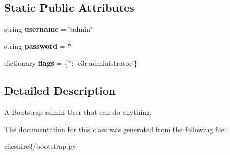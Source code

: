 \subsection*{Static Public Attributes}
\begin{DoxyCompactItemize}
\item 
\hypertarget{classcheshire3_1_1bootstrap_1_1_bootstrap_user_a3e72e213d3d348a2dc7ada96748bbce4}{string {\bfseries username} = \char`\"{}admin\char`\"{}}\label{classcheshire3_1_1bootstrap_1_1_bootstrap_user_a3e72e213d3d348a2dc7ada96748bbce4}

\item 
\hypertarget{classcheshire3_1_1bootstrap_1_1_bootstrap_user_a5494e235ec78eeedebb24005b317c0aa}{string {\bfseries password} = \char`\"{}\char`\"{}}\label{classcheshire3_1_1bootstrap_1_1_bootstrap_user_a5494e235ec78eeedebb24005b317c0aa}

\item 
\hypertarget{classcheshire3_1_1bootstrap_1_1_bootstrap_user_a125f113287293e3561211e26b60fda39}{dictionary {\bfseries flags} = \{''\-: 'c3r\-:administrator'\}}\label{classcheshire3_1_1bootstrap_1_1_bootstrap_user_a125f113287293e3561211e26b60fda39}

\end{DoxyCompactItemize}


\subsection{Detailed Description}
\begin{DoxyVerb}A Bootstrap admin User that can do anything.\end{DoxyVerb}
 

The documentation for this class was generated from the following file\-:\begin{DoxyCompactItemize}
\item 
cheshire3/bootstrap.\-py\end{DoxyCompactItemize}
